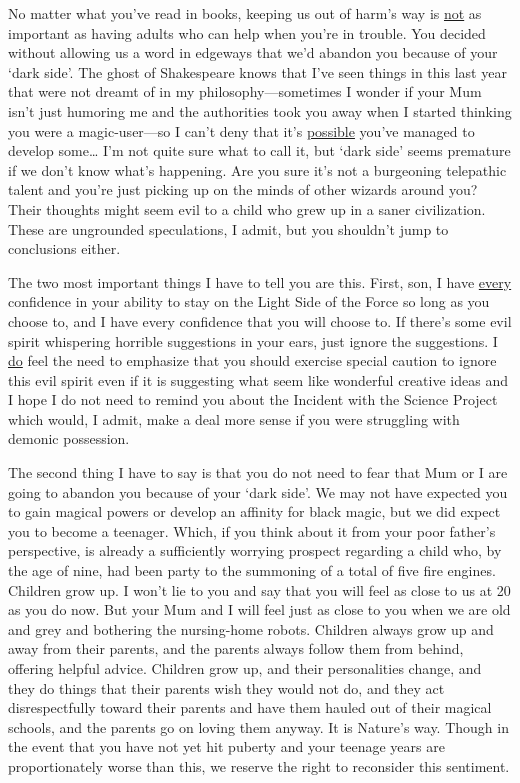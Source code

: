 \begin{writtenNote}

No matter what you've read in books, keeping us out of harm's way is
\underline{not} as important as having adults who can help when you're in
trouble. You decided without allowing us a word in edgeways that we'd abandon you
because of your `dark side'. The ghost of Shakespeare knows that I've seen
things in this last year that were not dreamt of in my philosophy---sometimes I
wonder if your Mum isn't just humoring me and the authorities took you away
when I started thinking you were a magic-user---so I can't deny that it's
\underline{possible} you've managed to develop some{\ldots} I'm not quite sure
what to call it, but `dark side' seems premature if we don't know what's
happening. Are you sure it's not a burgeoning telepathic talent and you're just
picking up on the minds of other wizards around you? Their thoughts might seem
evil to a child who grew up in a saner civilization. These are ungrounded
speculations, I admit, but you shouldn't jump to conclusions either.

The two most important things I have to tell you are this. First, son, I
have \underline{every} confidence in your ability to stay on the Light Side of
the Force so long as you choose to, and I have every confidence that you will
choose to. If there's some evil spirit whispering horrible suggestions in your
ears, just ignore the suggestions. I \underline{do} feel the need to emphasize
that you should exercise special caution to ignore this evil spirit even if it
is suggesting what seem like wonderful creative ideas and I hope I do not need
to remind you about the Incident with the Science Project which would, I admit,
make a deal more sense if you were struggling with demonic possession.

The second thing I have to say is that you do not need to fear that Mum
or I are going to abandon you because of your `dark side'. We may not have
expected you to gain magical powers or develop an affinity for black magic, but
we did expect you to become a teenager. Which, if you think about it from your
poor father's perspective, is already a sufficiently worrying prospect
regarding a child who, by the age of nine, had been party to the summoning of a
total of five fire engines. Children grow up. I won't lie to you and say that
you will feel as close to us at 20 as you do now. But your Mum and I will feel
just as close to you when we are old and grey and bothering the nursing-home
robots. Children always grow up and away from their parents, and the parents
always follow them from behind, offering helpful advice. Children grow up, and
their personalities change, and they do things that their parents wish they
would not do, and they act disrespectfully toward their parents and have them
hauled out of their magical schools, and the parents go on loving them anyway.
It is Nature's way. Though in the event that you have not yet hit puberty and
your teenage years are proportionately worse than this, we reserve the right to
reconsider this sentiment.


\end{writtenNote}
